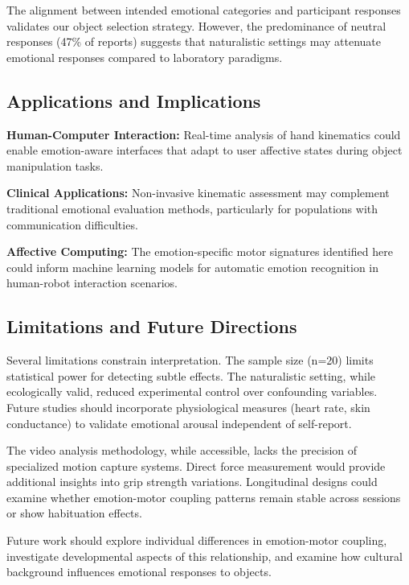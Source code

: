 \documentclass[conference]{IEEEtran}
\begin{document}
The alignment between intended emotional categories and participant 
responses validates our object selection strategy. However, the 
predominance of neutral responses (47\% of reports) suggests that 
naturalistic settings may attenuate emotional responses compared to 
laboratory paradigms.

\subsection{Applications and Implications}

\textbf{Human-Computer Interaction:} Real-time analysis of hand 
kinematics could enable emotion-aware interfaces that adapt to user 
affective states during object manipulation tasks.

\textbf{Clinical Applications:} Non-invasive kinematic assessment 
may complement traditional emotional evaluation methods, particularly 
for populations with communication difficulties.

\textbf{Affective Computing:} The emotion-specific motor signatures 
identified here could inform machine learning models for automatic 
emotion recognition in human-robot interaction scenarios.

\subsection{Limitations and Future Directions}

Several limitations constrain interpretation. The sample size (n=20) 
limits statistical power for detecting subtle effects. The naturalistic 
setting, while ecologically valid, reduced experimental control over 
confounding variables. Future studies should incorporate physiological 
measures (heart rate, skin conductance) to validate emotional arousal 
independent of self-report.

The video analysis methodology, while accessible, lacks the precision 
of specialized motion capture systems. Direct force measurement would 
provide additional insights into grip strength variations. Longitudinal 
designs could examine whether emotion-motor coupling patterns remain 
stable across sessions or show habituation effects.

Future work should explore individual differences in emotion-motor 
coupling, investigate developmental aspects of this relationship, and 
examine how cultural background influences emotional responses to objects.

\end{document}
